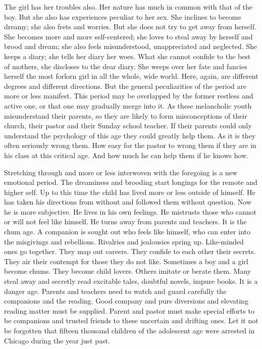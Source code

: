 The girl has her troubles also. Her nature has much in common with that of the boy. But she also has experiences peculiar to her sex. She inclines to become dreamy; she also frets and worries. But she does not try to get away from herself. She becomes more and more self-centered; she loves to steal away by herself and brood and dream; she also feels misunderstood, unappreciated and neglected. She keeps a diary; she tells her diary her woes. What she cannot confide to the
best of mothers, she discloses to the dear diary. She weeps over her fate and fancies herself the most forlorn girl in all the whole, wide world. Here, again, are different degrees and different directions. But the general peculiarities of the period are more or less manifest. This period may be overlapped by the former restless and active one, or that one may gradually merge into it. As these melancholic youth misunderstand their parents, so they are likely to form misconceptions of their church, their pastor and their Sunday school teacher. If their parents could only understand the psychology of this age they could greatly help them. As it is they often seriously wrong them. How easy for the pastor to wrong them if they are in his class at this critical age. And how much he can help them if he knows how.

Stretching through and more or less interwoven with the foregoing is a new emotional period. The dreaminess and brooding start longings for the remote and higher self. Up to this time the child has lived more or less outside of himself. He has taken his directions from without and followed them without question. Now he is more subjective. He lives in his own feelings. He mistrusts those who cannot or will not feel like himself. He turns away from parents and teachers. It is the chum age. A companion is sought out who feels like himself, who
can enter into the misgivings and rebellions. Rivalries and jealousies spring up. Like-minded ones go together. They map out careers. They confide to each other their secrets. They air their contempt for those they do not like. Sometimes a boy and a girl become chums. They become child lovers. Others imitate or berate them. Many steal away and secretly read excitable tales, doubtful novels, impure books. It is a danger age. Parents and teachers need to watch and guard carefully the companions and the reading. Good company and pure diversions and elevating reading matter must be supplied. Parent and pastor must make special efforts to be companions and trusted friends to these uncertain and drifting ones. Let it not be forgotten that fifteen thousand children of the adolescent age were arrested in Chicago during the year just past.

